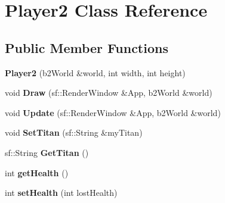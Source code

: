 \hypertarget{class_player2}{}\section{Player2 Class Reference}
\label{class_player2}
\subsection*{Public Member Functions}
\begin{DoxyCompactItemize}
\item 
{\bfseries Player2} (b2\+World \&world, int width, int height)\hypertarget{class_player2_ab6f6100e1784b41b214120245c14ca64}{}\label{class_player2_ab6f6100e1784b41b214120245c14ca64}

\item 
void {\bfseries Draw} (sf\+::\+Render\+Window \&App, b2\+World \&world)\hypertarget{class_player2_a15a3b03d0c4b626b4ccce8b8915c8faf}{}\label{class_player2_a15a3b03d0c4b626b4ccce8b8915c8faf}

\item 
void {\bfseries Update} (sf\+::\+Render\+Window \&App, b2\+World \&world)\hypertarget{class_player2_a58737283a33ba097e00b7c2ee81d4725}{}\label{class_player2_a58737283a33ba097e00b7c2ee81d4725}

\item 
void {\bfseries Set\+Titan} (sf\+::\+String \&my\+Titan)\hypertarget{class_player2_a3b909abeda7f100ea87d4fe093f69ba3}{}\label{class_player2_a3b909abeda7f100ea87d4fe093f69ba3}

\item 
sf\+::\+String {\bfseries Get\+Titan} ()\hypertarget{class_player2_a78afacc1fa76d8459fe6ef9f8d95d301}{}\label{class_player2_a78afacc1fa76d8459fe6ef9f8d95d301}

\item 
int {\bfseries get\+Health} ()\hypertarget{class_player2_ae1d5d6a613f4724189df9352f9df6bb1}{}\label{class_player2_ae1d5d6a613f4724189df9352f9df6bb1}

\item 
int {\bfseries set\+Health} (int lost\+Health)\hypertarget{class_player2_a5098de979ab588cfb24cc5a3f42ed656}{}\label{class_player2_a5098de979ab588cfb24cc5a3f42ed656}

\end{DoxyCompactItemize}
